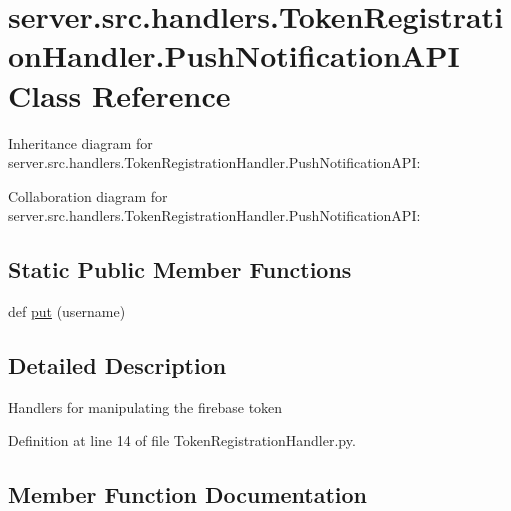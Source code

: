 \hypertarget{classserver_1_1src_1_1handlers_1_1_token_registration_handler_1_1_push_notification_a_p_i}{}\section{server.\+src.\+handlers.\+Token\+Registration\+Handler.\+Push\+Notification\+A\+PI Class Reference}
\label{classserver_1_1src_1_1handlers_1_1_token_registration_handler_1_1_push_notification_a_p_i}


Inheritance diagram for server.\+src.\+handlers.\+Token\+Registration\+Handler.\+Push\+Notification\+A\+PI\+:


Collaboration diagram for server.\+src.\+handlers.\+Token\+Registration\+Handler.\+Push\+Notification\+A\+PI\+:
\subsection*{Static Public Member Functions}
\begin{DoxyCompactItemize}
\item 
def \hyperlink{classserver_1_1src_1_1handlers_1_1_token_registration_handler_1_1_push_notification_a_p_i_a256fe9064ed11ca24305c7009dcea8ee}{put} (username)
\end{DoxyCompactItemize}


\subsection{Detailed Description}
\begin{DoxyVerb}Handlers for manipulating the firebase token\end{DoxyVerb}
 

Definition at line 14 of file Token\+Registration\+Handler.\+py.



\subsection{Member Function Documentation}
